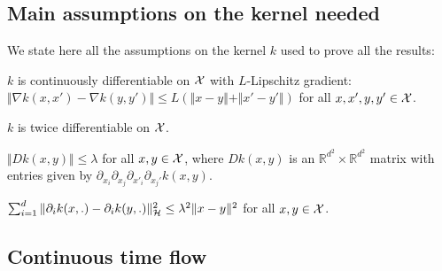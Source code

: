 \subsection{Main assumptions on the kernel needed}
We state here all the assumptions on the kernel $k$ used to prove all the results:%
\begin{assumplist}
	\item \label{assump:lipschitz_gradient_k} $k$ is continuously differentiable on ${{\mathcal X}}$ with $L$-Lipschitz gradient: $\Vert  \nabla k(x,x') - \nabla k(y,y')\Vert \leq L(\Vert  x-y\Vert + \Vert x'-y' \Vert ) $ for all $x,x',y,y' \in {{\mathcal X}}$.
	\item \label{assump:diff_kernel} $k$ is twice differentiable on ${{\mathcal X}}$.
	\item \label{assump:bounded_fourth_oder} $\Vert Dk(x,y) \Vert\leq \lambda  $ for all $x,y\in {{\mathcal X}}$, where $Dk(x,y)$ is an $\mathbb{R}^{d^2}\times \mathbb{R}^{d^2}$ matrix with entries given by $\partial_{x_{i}}\partial_{x_{j}}\partial_{x'_{i}}\partial_{x_{j}'}k(x,y)$.
	\item \label{assump:Lipschitz_grad_rkhs} $ \sum_{i=1}^d\Vert  \partial_i k(x,.) - \partial_i k(y,.)\Vert^2_{{{\mathcal H}}} \leq \lambda^2 \Vert  x-y\Vert^2 $ for all $x,y\in {{\mathcal X}}$.

\end{assumplist}


\subsection{Continuous time flow}


%

